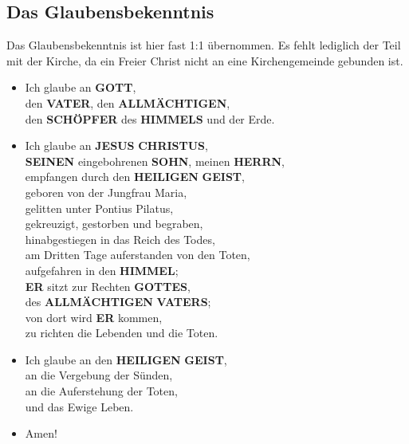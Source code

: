 \documentclass[12pt,a5paper]{article}
\newcommand{\Allmaechtigen}[0]{\textbf{ALLM\"ACHTIGEN}}
\newcommand{\Christus}[0]{\textbf{CHRISTUS}}
\newcommand{\Er}[0]{\textbf{ER}}
\newcommand{\Geist}[0]{\textbf{GEIST}}
\newcommand{\Gottes}[0]{\textbf{GOTTES}}
\newcommand{\Gott}[0]{\textbf{GOTT}}
\newcommand{\Heiligen}[0]{\textbf{HEILIGEN}}
\newcommand{\Herrn}[0]{\textbf{HERRN}}
\newcommand{\Himmel}[0]{\textbf{HIMMEL}}
\newcommand{\Himmels}[0]{\textbf{HIMMELS}}
\newcommand{\Jesus}[0]{\textbf{JESUS}}
\newcommand{\Schoepfer}[0]{\textbf{SCH\"OPFER}}
\newcommand{\Seinen}[0]{\textbf{SEINEN}}
\newcommand{\Sohn}[0]{\textbf{SOHN}}
\newcommand{\Vater}[0]{\textbf{VATER}}
\newcommand{\Vaters}[0]{\textbf{VATERS}}
\begin{document}
	\subsection{Das Glaubensbekenntnis}
		Das Glaubensbekenntnis ist hier fast 1:1 \"ubernommen.
		Es fehlt lediglich der Teil mit der Kirche,
		da ein Freier Christ nicht an eine Kirchengemeinde gebunden ist.
		\\
		\begin{itemize}[nosep]
			\item	Ich glaube an {\Gott},
			\\		den {\Vater},
					den {\Allmaechtigen},
			\\		den {\Schoepfer} des {\Himmels} und der Erde.
			\item	Ich glaube an {\Jesus} {\Christus},
			\\		{\Seinen} eingebohrenen {\Sohn},
					meinen {\Herrn},
			\\		empfangen durch den {\Heiligen} {\Geist},
			\\		geboren von der Jungfrau Maria,
			\\		gelitten unter Pontius Pilatus,
			\\		gekreuzigt,
					gestorben und begraben,
			\\		hinabgestiegen in das Reich des Todes,
			\\		am Dritten Tage auferstanden von den Toten,
			\\		aufgefahren in den {\Himmel};
			\\		{\Er} sitzt zur Rechten {\Gottes},
			\\		des {\Allmaechtigen} {\Vaters};
			\\		von dort wird {\Er} kommen,
			\\		zu richten die Lebenden und die Toten.
			\item	Ich glaube an den {\Heiligen} {\Geist},
			\\		an die Vergebung der S\"unden,
			\\		an die Auferstehung der Toten,
			\\		und das Ewige Leben.
			\item	Amen!
		\end{itemize}
		
\end{document}
